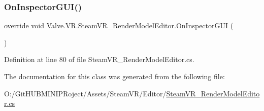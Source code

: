 \subsubsection{\texorpdfstring{OnInspectorGUI()}{OnInspectorGUI()}}
{\footnotesize\ttfamily override void Valve.\+V\+R.\+Steam\+V\+R\+\_\+\+Render\+Model\+Editor.\+On\+Inspector\+G\+UI (\begin{DoxyParamCaption}{ }\end{DoxyParamCaption})}



Definition at line 80 of file Steam\+V\+R\+\_\+\+Render\+Model\+Editor.\+cs.



The documentation for this class was generated from the following file\+:\begin{DoxyCompactItemize}
\item 
O\+:/\+Git\+H\+U\+B\+M\+I\+N\+I\+P\+Roject/\+Assets/\+Steam\+V\+R/\+Editor/\mbox{\hyperlink{_steam_v_r___render_model_editor_8cs}{Steam\+V\+R\+\_\+\+Render\+Model\+Editor.\+cs}}\end{DoxyCompactItemize}

